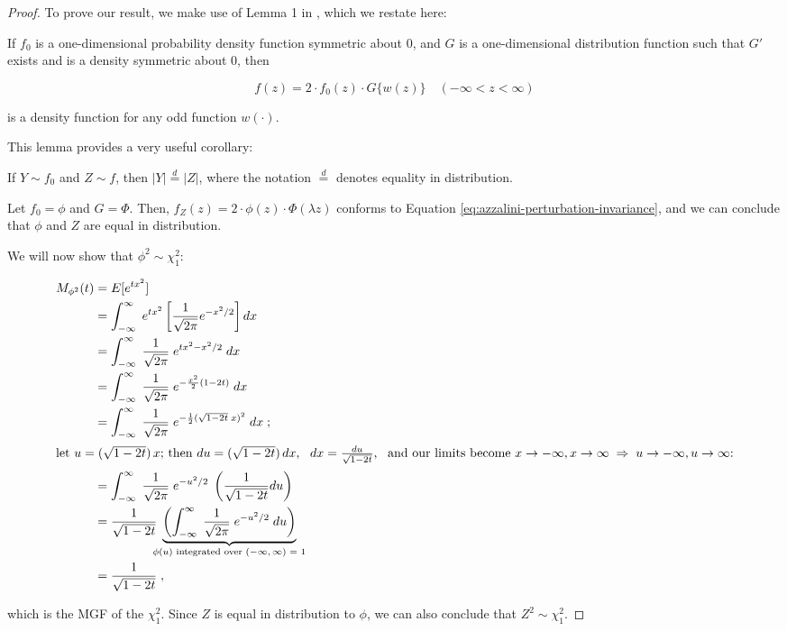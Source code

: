 \documentclass{article}
\begin{document}
\begin{proof}
  To prove our result, we make use of Lemma 1 in \citet{azzalini}, which we
  restate here:

  \begin{helper-lem}
    If $f_0$ is a one-dimensional probability density function symmetric about
    0, and $G$ is a one-dimensional distribution function such that $G'$ exists
    and is a density symmetric about 0, then

    \begin{equation}
      \label{eq:azzalini-perturbation-invariance}
      f(z) = 2 \cdot f_0(z) \cdot G\{w(z)\} \quad (-\infty < z < \infty)
    \end{equation}

    is a density function for any odd function $w(\cdot)$.
  \end{helper-lem}

  This lemma provides a very useful corollary:

  \begin{helper-cor}
    If $Y \sim f_0$ and $Z \sim f$, then $|Y| \overset{d}{=} |Z|$, where the
    notation $\overset{d}{=}$ denotes equality in distribution.    
  \end{helper-cor}

  Let $f_0 = \phi$ and $G = \Phi$. Then, $f_Z(z) = 2 \cdot \phi(z) \cdot
  \Phi(\lambda z)$ conforms to Equation
  \eqref{eq:azzalini-perturbation-invariance}, and we can conclude that $\phi$
  and $Z$ are equal in distribution.

  We will now show that $\phi^2 \sim \chi^2_1$:

  \begin{align*}
    M_{\phi^2}(t) &= E[e^{tx^2}] \\
    &= \int_{-\infty}^\infty \; e^{tx^2} \left[ \frac{1}{\sqrt{2\pi}} e^{-x^2/2} \right] dx \\
    &= \int_{-\infty}^\infty \; \frac{1}{\sqrt{2\pi}} \; e^{tx^2 - x^2/2} \; dx \\
    &= \int_{-\infty}^\infty \; \frac{1}{\sqrt{2\pi}} \; e^{-\frac{x^2}{2}(1 - 2t)} \; dx \\
    &= \int_{-\infty}^\infty \; \frac{1}{\sqrt{2\pi}} \; e^{-\frac{1}{2}(\sqrt{1-2t} \; x)^2} \; dx \;; \\
    \intertext{let $u = (\sqrt{1-2t}) \, x$; then $du = (\sqrt{1-2t}) \, dx$, \enspace $dx = \frac{du}{\sqrt{1-2t}}$, \enspace and our limits become $x \to -\infty, x \to \infty \Ra
      u \to -\infty, u \to \infty$:}
    &= \int_{-\infty}^\infty \; \frac{1}{\sqrt{2\pi}} \; e^{-u^2/2} \; \left( \frac{1}{\sqrt{1-2t}} du \right) \\
    &= \frac{1}{\sqrt{1-2t}} \; \underbrace{\left( \int_{-\infty}^\infty \; \frac{1}{\sqrt{2\pi}} \; e^{-u^2/2} \; du \right)}_{\mathclap{\textnormal{$\phi(u)$ integrated over
      $(-\infty,\infty)$ = 1}}} \label{phi-pdf} \\
    &= \frac{1}{\sqrt{1-2t}} \;,
  \end{align*}

  which is the MGF of the $\chi^2_1$. Since $Z$ is equal in distribution to
  $\phi$, we can also conclude that $Z^2 \sim \chi^2_1$. \end{proof}
\end{document}
